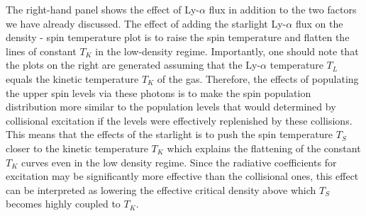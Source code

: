 \documentclass[12pt]{article}
\begin{document}
The right-hand panel shows the effect of Ly-$\alpha$ flux in addition to the two factors we have already discussed. The effect of adding the starlight Ly-$\alpha$ flux on the density - spin temperature plot is to raise the spin temperature and flatten the lines of constant $T_K$ in the low-density regime. Importantly, one should note that the plots on the right are generated assuming that the Ly-$\alpha$ temperature $T_L$ equals the kinetic temperature $T_K$ of the gas. Therefore, the effects of populating the upper spin levels via these photons is to make the spin population distribution more similar to the population levels that would determined by collisional excitation if the levels were effectively replenished by these collisions. This means that the effects of the starlight is to push the spin temperature $T_S$ closer to the kinetic temperature $T_K$ which explains the flattening of the constant $T_K$ curves even in the low density regime. Since the radiative coefficients for excitation may be significantly more effective than the collisional ones, this effect can be interpreted as lowering the effective critical density above which $T_S$ becomes highly coupled to $T_K$. 
\end{document}

